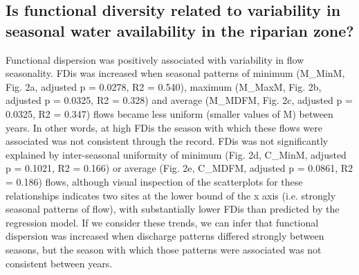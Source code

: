 \documentclass[openright,12pt,a4paper]{memoir}
\begin{document}
\subsection{Is functional diversity related to variability in seasonal water availability in the riparian zone?}
Functional dispersion was positively associated with variability in flow seasonality. FDis was increased when seasonal patterns of minimum (M\_MinM, Fig. 2a, adjusted p = 0.0278, R2 = 0.540), maximum (M\_MaxM, Fig. 2b, adjusted p = 0.0325, R2 = 0.328) and average (M\_MDFM, Fig. 2c, adjusted p = 0.0325, R2 = 0.347) flows became less uniform (smaller values of M) between years. In other words, at high FDis the season with which these flows were associated was not consistent through the record. FDis was not significantly explained by inter-seasonal uniformity of minimum (Fig. 2d, C\_MinM, adjusted p = 0.1021, R2 = 0.166) or average (Fig. 2e, C\_MDFM, adjusted p = 0.0861, R2 = 0.186) flows, although visual inspection of the scatterplots for these relationships indicates two sites at the lower bound of the x axis (i.e. strongly seasonal patterns of flow), with substantially lower FDis than predicted by the regression model. If we consider these trends, we can infer that functional dispersion was increased when discharge patterns differed strongly between seasons, but the season with which those patterns were associated was not consistent between years.
\end{document}
